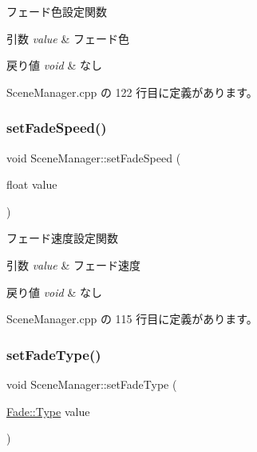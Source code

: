 フェード色設定関数 


\begin{DoxyParams}{引数}
{\em value} & フェード色 \\
\hline
\end{DoxyParams}

\begin{DoxyRetVals}{戻り値}
{\em void} & なし \\
\hline
\end{DoxyRetVals}


 Scene\+Manager.\+cpp の 122 行目に定義があります。

\mbox{\label{class_scene_manager_af3b87ef963b80aa1942a2f804f61bdeb}} 
\subsubsection{\texorpdfstring{set\+Fade\+Speed()}{setFadeSpeed()}}
{\footnotesize\ttfamily void Scene\+Manager\+::set\+Fade\+Speed (\begin{DoxyParamCaption}\item[{float}]{value }\end{DoxyParamCaption})}



フェード速度設定関数 


\begin{DoxyParams}{引数}
{\em value} & フェード速度 \\
\hline
\end{DoxyParams}

\begin{DoxyRetVals}{戻り値}
{\em void} & なし \\
\hline
\end{DoxyRetVals}


 Scene\+Manager.\+cpp の 115 行目に定義があります。

\mbox{\label{class_scene_manager_a95bb32ee4d3461bf56381d288a98c61b}} 
\subsubsection{\texorpdfstring{set\+Fade\+Type()}{setFadeType()}}
{\footnotesize\ttfamily void Scene\+Manager\+::set\+Fade\+Type (\begin{DoxyParamCaption}\item[{\mbox{\hyperlink{class_fade_ac06f27215b454aa05b93c236476d6e80}{Fade\+::\+Type}}}]{value }\end{DoxyParamCaption})}



